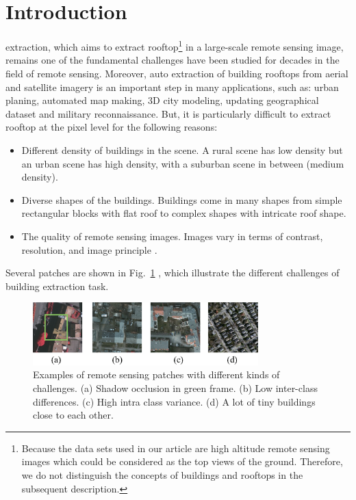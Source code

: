 %
\section{Introduction}
\label{sec:intro}



 extraction, which aims to extract rooftop\footnote{Because the data sets used in our article are high altitude remote sensing images which could be considered as the top views of the ground. Therefore, we do not distinguish the concepts of buildings and rooftops in the subsequent description.} in a large-scale remote sensing image, remains one of the fundamental challenges have been studied for decades in the field of remote sensing. Moreover, auto extraction of building rooftops from aerial and satellite imagery is an important step in many applications, such as: urban planing, automated map making, 3D city modeling, updating geographical dataset and military reconnaissance. But, it is particularly difficult to extract rooftop at the pixel level for the following reasons:
\begin{itemize}
 \item Different density of buildings in the scene. A rural scene has low density but an urban scene has high density, with a suburban scene in between (medium density).
 \item Diverse shapes of the buildings. Buildings come in many shapes from simple rectangular blocks with flat roof to complex shapes with intricate roof shape.
 \item The quality of remote sensing images. Images vary in terms of contrast, resolution, and image principle \cite{IEEEexample:huertas1988detecting}.
\end{itemize}

 Several patches are shown in Fig.~\ref{fig:intro}  , which illustrate the different challenges of building extraction task.


\begin{figure}
\includegraphics[width=8.7cm]{Figures/challenge.eps}
\caption{Examples of remote sensing patches with different kinds of challenges. (a) Shadow occlusion in green frame. (b) Low inter-class differences. (c) High intra class variance. (d) A lot of tiny buildings close to each other.}
\label{fig:intro}
\end{figure}


